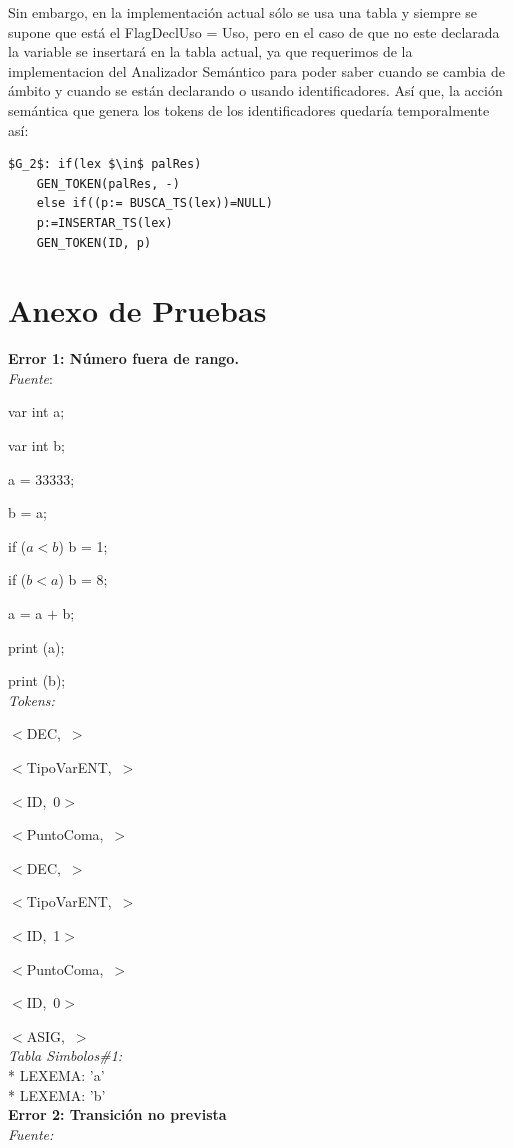 \documentclass[a4paper, 12pt]{article}
\begin{document}
Sin embargo, en la implementación actual sólo se usa una tabla y siempre se supone que está el FlagDeclUso = Uso, pero en el caso de que no este declarada la variable se insertará en la tabla actual, ya que requerimos de la implementacion del Analizador Semántico para poder saber cuando se cambia de ámbito y cuando se están declarando o usando identificadores. Así que, la acción semántica que genera los tokens de los identificadores quedaría temporalmente así:
\begin{lstlisting}
$G_2$: if(lex $\in$ palRes)
	GEN_TOKEN(palRes, -)
    else if((p:= BUSCA_TS(lex))=NULL)
	p:=INSERTAR_TS(lex)
	GEN_TOKEN(ID, p)
\end{lstlisting}

\section{Anexo de Pruebas}

\textbf{Error 1: Número fuera de rango.} \\ 
\emph{Fuente}:


var int a;


var int b;


a = 33333;


b = a;


 if ($a  <  b$) b  =  1; 
 
 
if ($b  <  a$) b  =  8;


 a = a  $+$  b;
 
 
print (a);


print (b);\medskip\\
\emph{Tokens:}


\mbox{$<$DEC, $>$}


\mbox{$<$TipoVarENT, $>$}


\mbox{$<$ID, 0$>$}


\mbox{$<$PuntoComa, $>$}


\mbox{$<$DEC, $>$}


\mbox{$<$TipoVarENT, $>$}


\mbox{$<$ID, 1$>$}


\mbox{$<$PuntoComa, $>$}


\mbox{$<$ID, 0$>$}


\mbox{$<$ASIG, $>$}\medskip\\
\emph{Tabla Simbolos\#1:}\\
  \mbox{*} LEXEMA: 'a'\\
  \mbox{*} LEXEMA: 'b'\bigskip \\
\textbf{Error 2: Transición no prevista}\medskip\\
\emph{Fuente:} 
\end{document}
